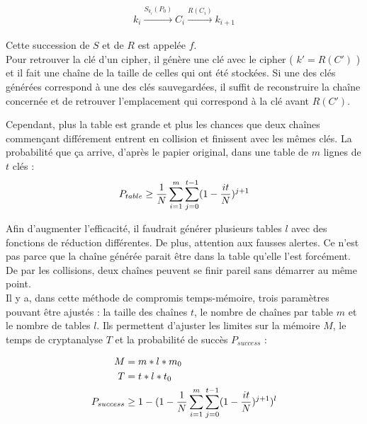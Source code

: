 	\begin{align*}
		k_i \overset{S_{k_i}(P_0)}{\longrightarrow} C_i \overset{R(C_i)}{\longrightarrow} k_{i+1}
	\end{align*}

	Cette succession de $S$ et de $R$ est appelée $f$.\\

	Pour retrouver la clé d'un \gls{cipher}, il génère une clé avec le \gls{cipher} ( $k' = R(C')$ ) et il fait une chaîne de la taille de celles qui ont été stockées. Si une des clés générées correspond à une des clés sauvegardées, il suffit de reconstruire la chaîne concernée et de retrouver l'emplacement qui correspond à la clé avant $R(C')$.

	Cependant, plus la table est grande et plus les chances que deux chaînes commençant différement entrent en collision et finissent avec les mêmes clés. La probabilité que ça arrive, d'après le papier original\cite{ehellman}, dans une table de $m$ lignes de $t$ clés :\\

	\begin{align*}
		P_{table} \ge{} \frac{1}{N} \sum\limits_{i=1}^{m}\sum\limits_{j=0}^{t-1} (1 - \frac{it}{N})^{j+1}
	\end{align*}

	Afin d'augmenter l'efficacité, il faudrait générer plusieurs tables $l$ avec des fonctions de réduction différentes. De plus, attention aux fausses alertes. Ce n'est pas parce que la chaîne générée parait être dans la table qu'elle l'est forcément. De par les collisions, deux chaînes peuvent se finir pareil sans démarrer au même point.\\

	Il y a, dans cette méthode de compromis temps-mémoire, trois paramètres pouvant être ajustés : la taille des chaînes $t$, le nombre de chaînes par table $m$ et le nombre de tables $l$. Ils permettent d'ajuster les limites sur la mémoire $M$, le temps de cryptanalyse $T$ et la probabilité de succès $P_{success}$\cite{Oech03} :

	\begin{align*}
		M &= m*l*m_0\\
		T &= t*l*t_0\\
		P_{success} &\ge{} 1 - (1 - \frac{1}{N} \sum\limits_{i=1}^{m}\sum\limits_{j=0}^{t-1} (1 - \frac{it}{N})^{j+1})^l
	\end{align*}

\endinput{}
